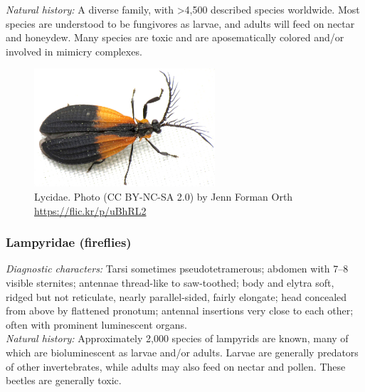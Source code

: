 \documentclass[letterpaper, 11pt]{article}
\begin{document}
\noindent{}\textit{Natural history:} A diverse family, with \textgreater4,500 described species worldwide. Most species are understood to be fungivores as larvae, and adults will feed on nectar and honeydew. Many species are toxic and are aposematically colored and/or involved in mimicry complexes.

\begin{figure}[ht!]
  \centering
    \includegraphics[width=0.6\textwidth]{LycidHabitus}
  \caption{Lycidae. Photo (CC BY-NC-SA 2.0) by Jenn Forman Orth \url{https://flic.kr/p/uBhRL2}}
  \label{fig:lycid}
\end{figure}

\subsubsection{Lampyridae (fireflies)}
\noindent{}\textit{Diagnostic characters:} Tarsi sometimes pseudotetramerous; abdomen with 7--8 visible sternites; antennae thread-like to saw-toothed; body and elytra soft, ridged but not reticulate, nearly parallel-sided, fairly elongate; head concealed from above by flattened pronotum; antennal insertions very close to each other; often with prominent luminescent organs.\\

\noindent{}\textit{Natural history:} Approximately 2,000 species of lampyrids are known, many of which are bioluminescent as larvae and/or adults. Larvae are generally predators of other invertebrates, while adults may also feed on nectar and pollen. These beetles are generally toxic.
\end{document}
